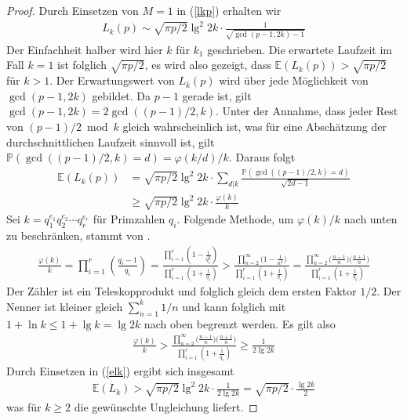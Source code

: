 \documentclass[a4paper, 10pt, ngerman]{article}
\newcommand{\E}{\mathbb{E}}
\renewcommand{\P}{\mathbb{P}}
\begin{document}
\begin{proof}
    Durch Einsetzen von $M = 1$ in (\ref{lkp}) erhalten wir
    \begin{align*}
        L_k(p) \sim \sqrt {\pi p / 2} \lg^2 2k \cdot \frac {1} {\sqrt{\gcd(p - 1, 2k) - 1}}
    \end{align*}
    Der Einfachheit halber wird hier $k$ für $k_1$ geschrieben. Die erwartete Laufzeit im Fall $k = 1$ ist folglich $\sqrt{\pi p/2}$, es wird also gezeigt, dass $\E(L_k(p)) > \sqrt{\pi p / 2}$ für $k > 1$. Der Erwartungswert von $L_k(p)$ wird über jede Möglichkeit von $\gcd(p - 1, 2k)$ gebildet. Da $p - 1$ gerade ist, gilt $\gcd(p - 1, 2k) = 2 \gcd((p - 1)/2, k)$. Unter der Annahme, dass jeder Rest von $(p - 1)/2 \bmod k$ gleich wahrscheinlich ist, was für eine Abschätzung der durchschnittlichen Laufzeit sinnvoll ist, gilt $\mathbb{P}(\gcd((p - 1)/2, k) = d) = \varphi(k/d)/k$. Daraus folgt
    \begin{align}
        \E(L_k(p))
         & = \sqrt{\pi p / 2} \lg^2 2k \cdot \sum_{d | k} \frac {\P(\gcd((p - 1)/2, k) = d)} { \sqrt {2d - 1}} \nonumber \\
         & \ge \sqrt{\pi p / 2} \lg^2 2k \cdot \frac {\varphi(k)} k \label{elk}
    \end{align}
    Sei $k = q_1^{e_1} q_2^{e_2} \cdots q_r^{e_r}$ für Primzahlen $q_i$. Folgende Methode, um $\varphi(k)/k$ nach unten zu beschränken, stammt von \cite{phi}.
    \begin{align*}
        \frac {\varphi(k)} k = \prod_{i = 1}^r \left ( \frac {q_i - 1} {q_i} \right )
        = \frac{\prod_{i = 1}^r \left ( 1 - \frac 1 {q_i^2} \right )}{\prod_{i = 1}^r \left ( 1 + \frac 1 {q_i} \right )}
        > \frac {\prod_{n = 2}^\infty \Big ( 1 - \frac 1 {n^2} \Big )} {\prod_{i = 1}^r \left ( 1 + \frac 1 {q_i} \right )}
        = \frac {\prod_{n = 2}^\infty \Big ( \frac {n - 1} {n} \Big ) \Big ( \frac {n + 1} n \Big )} {\prod_{i = 1}^r \left ( 1 + \frac 1 {q_i} \right )}
    \end{align*}
    Der Zähler ist ein Teleskopprodukt und folglich gleich dem ersten Faktor $1/2$. Der Nenner ist kleiner gleich $\sum_{n = 1}^{k} 1/n$ und kann folglich mit $1 + \ln k \le 1 + \lg k = \lg 2k$ nach oben begrenzt werden. Es gilt also
    \begin{align*}
        \frac {\varphi(k)} k
        > \frac {\prod_{n = 2}^\infty \Big ( \frac {n - 1} {n} \Big ) \Big ( \frac {n + 1} n \Big )} {\prod_{i = 1}^r \left ( 1 + \frac 1 {q_i} \right )}
        \ge \frac {1}{2\lg 2k}
    \end{align*}
    Durch Einsetzen in (\ref{elk}) ergibt sich insgesamt
    \begin{align*}
        \E(L_k) > \sqrt{\pi p / 2} \lg^2 2k \cdot \frac {1} {2 \lg 2k} = \sqrt {\pi p / 2} \cdot \frac {\lg 2k} {2}
    \end{align*}
    was für $k \ge 2$ die gewünschte Ungleichung liefert.
\end{proof}
\end{document}
